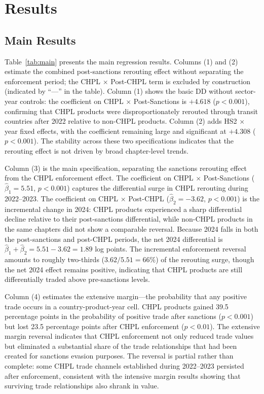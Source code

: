 \documentclass[12pt]{article}
\begin{document}
\section{Results}
\label{sec:results}

\subsection{Main Results}



Table~\ref{tab:main} presents the main regression results. Columns (1) and (2) estimate the combined post-sanctions rerouting effect without separating the enforcement period; the CHPL $\times$ Post-CHPL term is excluded by construction (indicated by ``---'' in the table). Column (1) shows the basic DD without sector-year controls: the coefficient on CHPL $\times$ Post-Sanctions is $+4.618$ ($p < 0.001$), confirming that CHPL products were disproportionately rerouted through transit countries after 2022 relative to non-CHPL products. Column (2) adds HS2 $\times$ year fixed effects, with the coefficient remaining large and significant at $+4.308$ ($p < 0.001$). The stability across these two specifications indicates that the rerouting effect is not driven by broad chapter-level trends.

Column (3) is the main specification, separating the sanctions rerouting effect from the CHPL enforcement effect. The coefficient on CHPL $\times$ Post-Sanctions ($\hat{\beta}_1 = 5.51$, $p < 0.001$) captures the differential surge in CHPL rerouting during 2022--2023. The coefficient on CHPL $\times$ Post-CHPL ($\hat{\beta}_2 = -3.62$, $p < 0.001$) is the incremental change in 2024: CHPL products experienced a sharp differential decline relative to their post-sanctions differential, while non-CHPL products in the same chapters did not show a comparable reversal. Because 2024 falls in both the post-sanctions and post-CHPL periods, the net 2024 differential is $\hat{\beta}_1 + \hat{\beta}_2 = 5.51 - 3.62 = 1.89$ log points. The incremental enforcement reversal amounts to roughly two-thirds ($3.62/5.51 = 66\%$) of the rerouting surge, though the net 2024 effect remains positive, indicating that CHPL products are still differentially traded above pre-sanctions levels.

Column (4) estimates the extensive margin---the probability that any positive trade occurs in a country-product-year cell. CHPL products gained 39.5 percentage points in the probability of positive trade after sanctions ($p < 0.001$) but lost 23.5 percentage points after CHPL enforcement ($p < 0.01$). The extensive margin reversal indicates that CHPL enforcement not only reduced trade values but eliminated a substantial share of the trade relationships that had been created for sanctions evasion purposes. The reversal is partial rather than complete: some CHPL trade channels established during 2022--2023 persisted after enforcement, consistent with the intensive margin results showing that surviving trade relationships also shrank in value.
\end{document}
